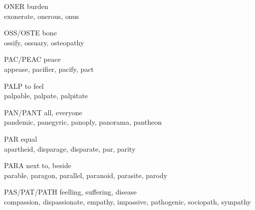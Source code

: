 \begin{flashcard}[Roots]{ONER}
burden\\
\vspace{0.2in}
exonerate, onerous, onus\\
\end{flashcard}

\begin{flashcard}[Roots]{OSS/OSTE}
bone\\
\vspace{0.2in}
ossify, ossuary, osteopathy\\
\end{flashcard}

\begin{flashcard}[Roots]{PAC/PEAC}
peace\\
\vspace{0.2in}
appease, pacifier, pacify, pact\\
\end{flashcard}

\begin{flashcard}[Roots]{PALP}
to feel\\
\vspace{0.2in}
palpable, palpate, palpitate\\
\end{flashcard}

\begin{flashcard}[Roots]{PAN/PANT}
all, everyone\\
\vspace{0.2in}
pandemic, panegyric, panoply, panorama, pantheon\\
\end{flashcard}

\begin{flashcard}[Roots]{PAR}
equal\\
\vspace{0.2in}
apartheid, disparage, disparate, par, parity\\
\end{flashcard}

\begin{flashcard}[Roots]{PARA}
next to, beside\\
\vspace{0.2in}
parable, paragon, parallel, paranoid, parasite, parody\\
\end{flashcard}

\begin{flashcard}[Roots]{PAS/PAT/PATH}
feelling, suffering, disease\\
\vspace{0.2in}
compassion, dispassionate, empathy, impassive, pathogenic, sociopath, sympathy\\
\end{flashcard}

